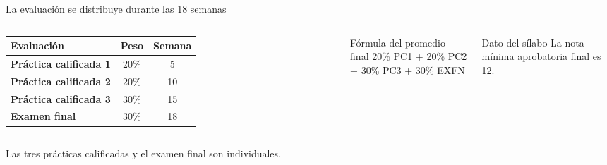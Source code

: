 \documentclass[aspectratio=169,10pt,c]{beamer}
\begin{document}
\begin{frame}{La evaluación se distribuye durante las 18 semanas}
\begin{columns}[T,onlytextwidth]
\small
\begin{tabular}{>{\bfseries}p{3.35cm}cc}
\toprule
Evaluación & Peso & Semana\\
\midrule
Práctica calificada 1 & 20\% & 5\\
Práctica calificada 2 & 20\% & 10\\
Práctica calificada 3 & 30\% & 15\\
Examen final & 30\% & 18\\
\bottomrule
\end{tabular}
\begin{block}{Fórmula del promedio final}
\centering\small
20\% PC1 + 20\% PC2\\
+ 30\% PC3 + 30\% EXFN
\end{block}
\begin{alertblock}{Dato del sílabo}
\small La nota mínima aprobatoria final es 12.
\end{alertblock}
\end{columns}
\vspace{0.25cm}
\small Las tres prácticas calificadas y el examen final son individuales.
\end{frame}
\end{document}
